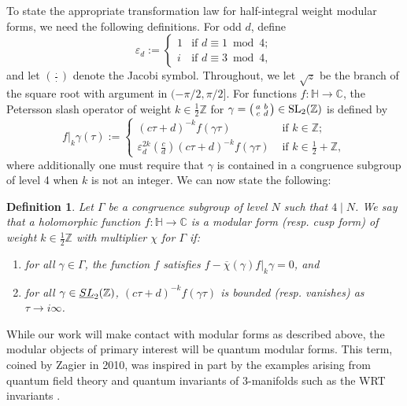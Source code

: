 \documentclass[11pt,letterpaper]{amsart}
\theoremstyle{definition}
\theoremstyle{plain}
\newtheorem{definition}[theorem]{Definition}
\numberwithin{equation}{section}
\theoremstyle{example}
\begin{document}
To state the appropriate transformation law for half-integral weight modular forms, we need the following definitions. For odd $d$, define 
\[\varepsilon_d := \begin{cases}
1 & \text{if } d \equiv 1 \bmod{4}; \\
i & \text{if } d \equiv 3 \bmod{4},
\end{cases}
\]
and let $\left(\frac{\cdot}{\cdot}\right)$ denote the Jacobi symbol. Throughout, we let $\sqrt{z}$ be the branch of the square root with argument in $(-\pi/2, \pi/2]$.
For functions $f\colon \mathbb{H} \to \mathbb{C}$, the Petersson slash operator of weight $k \in \frac{1}{2}\mathbb{Z}$ for $\gamma = \begin{psmallmatrix} a & b \\ c & d \end{psmallmatrix} \in \text{SL}_2(\mathbb{Z})$ is defined by
\[
f|_k\gamma(\tau):= \begin{cases}
(c\tau + d)^{-k} f(\gamma \tau)& \text{ if } k \in \mathbb{Z}; \\
\varepsilon_d^{2k}\left(\frac{c}{d}\right)(c\tau + d)^{-k}f(\gamma \tau) & \text{ if } k \in \frac{1}{2} + \mathbb{Z},
\end{cases}\]
where additionally one must require that $\gamma$ is contained in a congruence subgroup of level 4 when $k$ is not an integer. We can now state the following:

\begin{definition}
Let $\Gamma$ be a congruence subgroup of level $N$ such that $4 \mid N$. We say that a holomorphic function $f \colon \mathbb{H} \to \mathbb{C}$ is a modular form (resp. cusp form) of weight $k \in \frac{1}{2}\mathbb{Z}$ with multiplier $\chi$ for $\Gamma$ if:
\begin{enumerate}
\item for all $\gamma \in \Gamma$, the function $f$ satisfies $f -\overline{\chi}(\gamma) f|_{k}\gamma=0$, and
\item for all $\gamma \in \emph{SL}_2(\mathbb{Z})$, $(c\tau + d)^{-k}f( \gamma \tau)$ is bounded (resp. vanishes) as $\tau \to i\infty$. 
\end{enumerate}
\end{definition}

While our work will make contact with modular forms as described above, the modular objects of primary interest will be quantum modular forms. This term, coined by Zagier in 2010, was inspired in part by the examples arising from quantum field theory and quantum invariants of $3$-manifolds such as the WRT invariants \cite{zagier}.
\end{document}
